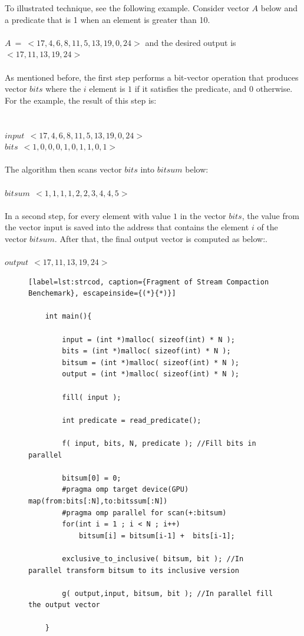 \documentclass[Ingles]{ic-tese-v1}
\begin{document}
To illustrated  technique, see the following example.
Consider  vector $A$ below and a predicate that is 1 when an element is greater than 10.\\\\
$A \: = \: <17, 4, 6, 8, 11, 5, 13, 19, 0, 24>$ and the desired output is   $<17, 11, 13, 19, 24>$\\\\
As mentioned before, the first step performs a bit-vector operation that produces vector $bits$ where
the $i$ element is $1$ if it satisfies the predicate, and $0$ otherwise. For the example, the result of this step is:\\\\\\
$input \:\: <17, 4, 6, 8, 11, 5, 13, 19, 0, 24>$\\
$bits \:\: <1, 0, 0, 0, 1, 0, 1, 1, 0, 1>$\\\\
The algorithm then scans vector $bits$ into $bitsum$ below:\\\\
$bitsum \:\: <1, 1, 1, 1, 2, 2, 3, 4, 4, 5> $\\\\
In a second step, for every element with value $1$ in the vector $bits$, the value from the vector input is saved into the address that contains the element $i$ of the vector $bitsum$. After that, the final output vector is computed as below:.\\\\
$output \:\: <17, 11, 13, 19, 24>$\\
\begin{figure}[t]
	\lstset{basicstyle=\scriptsize}
	\begin{lstlisting}[label=lst:strcod, caption={Fragment of Stream Compaction Benchemark}, escapeinside={(*}{*)}]

	int main(){

		input = (int *)malloc( sizeof(int) * N );
		bits = (int *)malloc( sizeof(int) * N );
		bitsum = (int *)malloc( sizeof(int) * N );
		output = (int *)malloc( sizeof(int) * N );

		fill( input );

		int predicate = read_predicate();

		f( input, bits, N, predicate ); //Fill bits in parallel

		bitsum[0] = 0;
		#pragma omp target device(GPU) map(from:bits[:N],to:bitssum[:N])
		#pragma omp parallel for scan(+:bitsum)
		for(int i = 1 ; i < N ; i++)
			bitsum[i] = bitsum[i-1] +  bits[i-1];

		exclusive_to_inclusive( bitsum, bit ); //In parallel transform bitsum to its inclusive version

		g( output,input, bitsum, bit ); //In parallel fill the output vector

	}
	\end{lstlisting}
\end{figure}
\end{document}
